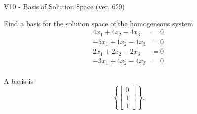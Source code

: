 \begin{exercise}
  \begin{exerciseTitle}V10 - Basis of Solution Space (ver. 629)\end{exerciseTitle}
  \begin{exerciseStatement}
    Find a basis for the solution space of the homogeneous system 
\begin{align*}
 4 x_ 1 + 4 x_ 2 -4 x_ 3 &= 0  \\ 
  -5 x_ 1 + 1 x_ 2 -1 x_ 3 &= 0  \\ 
  2 x_ 1 + 2 x_ 2 -2 x_ 3 &= 0  \\ 
  -3 x_ 1 + 4 x_ 2 -4 x_ 3 &= 0  \\ 
 \end{align*}


 
  \end{exerciseStatement}

  \begin{exerciseAnswer}
   A basis is   
\[\left\{\left[\begin{array}{c}
0 \\
1 \\
1
\end{array}\right]\right\}.\]

  


  \end{exerciseAnswer}
\end{exercise}